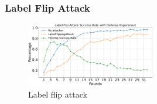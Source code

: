 \documentclass[conference]{IEEEtran}
\def\figLabelFlip{0.5\textwidth}
\begin{document}
\subsubsection{\textbf{Label Flip Attack}}
\label{exp:attack:label}

\begin{figure}[htbp]
    \centerline{\includegraphics[width=\figLabelFlip]{pics/002-LabelFlippingAttack-attackRate.pdf}}
    \vspace{-10px}  %
    \caption{Label flip attack\vspace{-8px}}
    \label{fig:labelFlip}
\end{figure}

\end{document}
